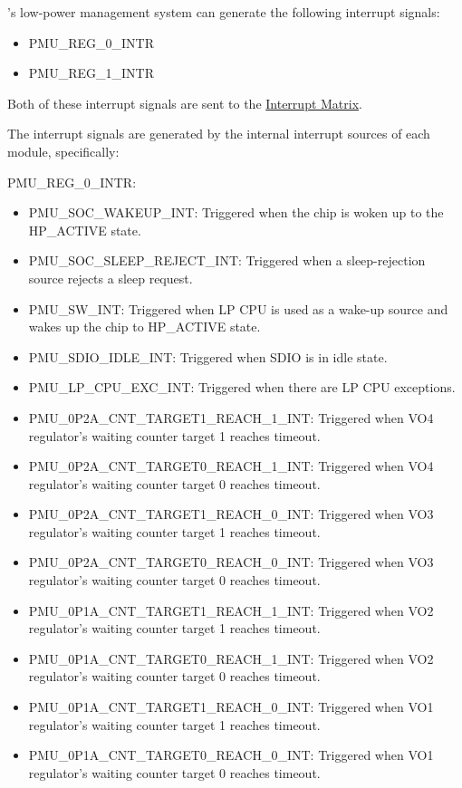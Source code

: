 \documentclass[main\_\_EN.tex]{subfiles}
\begin{document}
\chipname{}'s low-power management system can generate the following interrupt signals:

\begin{itemize}
\item PMU\_REG\_0\_INTR
\item PMU\_REG\_1\_INTR
\end{itemize}

Both of these interrupt signals are sent to the \hyperref[mod:intmtrx]{Interrupt Matrix}.

The interrupt signals are generated by the internal interrupt sources of each module, specifically:

PMU\_REG\_0\_INTR:

\begin{itemize}
\item \label{int:PMUSOCWAKEUPINT}PMU\_SOC\_WAKEUP\_INT: Triggered when the chip is woken up to the HP\_ACTIVE state.
\item \label{int:PMUSOCSLEEPREJECTINT}PMU\_SOC\_SLEEP\_REJECT\_INT: Triggered when a sleep-rejection source rejects a sleep request.
\item \label{int:PMUSWINT}PMU\_SW\_INT: Triggered when LP CPU is used as a wake-up source and wakes up the chip to HP\_ACTIVE state.
\item \label{int:PMUSDIOIDLEINT}PMU\_SDIO\_IDLE\_INT: Triggered when SDIO is in idle state.
\item \label{int:PMULPCPUEXCINT}PMU\_LP\_CPU\_EXC\_INT: Triggered when there are LP CPU exceptions.
\item \label{int:PMU0P2ACNTTARGET1REACH1INT}PMU\_0P2A\_CNT\_TARGET1\_REACH\_1\_INT: Triggered when VO4 regulator's waiting counter target 1 reaches timeout.
\item \label{int:PMU0P2ACNTTARGET0REACH1INT}PMU\_0P2A\_CNT\_TARGET0\_REACH\_1\_INT: Triggered when VO4 regulator's waiting counter target 0 reaches timeout.
\item \label{int:PMU0P2ACNTTARGET1REACH0INT}PMU\_0P2A\_CNT\_TARGET1\_REACH\_0\_INT: Triggered when VO3 regulator's waiting counter target 1 reaches timeout.
\item \label{int:PMU0P2ACNTTARGET0REACH0INT}PMU\_0P2A\_CNT\_TARGET0\_REACH\_0\_INT: Triggered when VO3 regulator's waiting counter target 0 reaches timeout.
\item \label{int:PMU0P1ACNTTARGET1REACH1INT}PMU\_0P1A\_CNT\_TARGET1\_REACH\_1\_INT: Triggered when VO2 regulator's waiting counter target 1 reaches timeout.
\item \label{int:PMU0P1ACNTTARGET0REACH1INT}PMU\_0P1A\_CNT\_TARGET0\_REACH\_1\_INT: Triggered when VO2 regulator's waiting counter target 0 reaches timeout.
\item \label{int:PMU0P1ACNTTARGET1REACH0INT}PMU\_0P1A\_CNT\_TARGET1\_REACH\_0\_INT: Triggered when VO1 regulator's waiting counter target 1 reaches timeout.
\item \label{int:PMU0P1ACNTTARGET0REACH0INT}PMU\_0P1A\_CNT\_TARGET0\_REACH\_0\_INT: Triggered when VO1 regulator's waiting counter target 0 reaches timeout.
\end{itemize}
\end{document}
